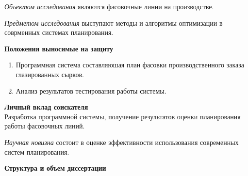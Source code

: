 \vspace{3mm}
\novelty
\vspace{3mm}

\textit{Объектом исследования} являются фасовочные линии на производстве.

\vspace{3mm}
\novelty
\vspace{3mm}

\textit{Предметом исследования} выступают методы и алгоритмы оптимизации в соврменных системах планирования.

\vspace{3mm}
\novelty
\vspace{3mm}

\noindent \textbf{Положения выносимые на защиту}
\begin{enumerate}
    \item Программная система составляюшая план фасовки производственного заказа глазированных сырков.
    \item Анализ результатов тестирования работы системы.
\end{enumerate}

\vspace{3mm}
\novelty
\vspace{3mm}

\noindent \textbf{Личный вклад соискателя}\\
\indent Разработка программной системы, получение результатов оценки планирования работы фасовочных линий.

\vspace{3mm}
\novelty
\vspace{3mm}

\textit{Научная новизна} состоит в оценке эффективности использования современных систем планирования.

\vspace{3mm}
\novelty
\vspace{3mm}

\noindent \textbf{Структура и объем диссертации}\\
